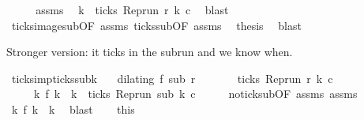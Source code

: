 \begin{isabellebody}
\ {\isacharminus}\isanewline
\ \ \isamarkupfalse%
\ assms{\isacharparenleft}{}{\isacharparenright}\ \isamarkupfalse%
\ k\ \ {\isacartoucheopen}ticks\ {\isacharparenleft}{\isacharparenleft}Rep{\isacharunderscore}run\ r{\isacharparenright}\ k\ c{\isacharparenright}{\isacartoucheclose}\ \isamarkupfalse%
\ blast\isanewline
\ \ \isamarkupfalse%
\ ticks{\isacharunderscore}image{\isacharunderscore}sub{\isacharbrackleft}OF\ assms{\isacharparenleft}{}{\isacharparenright}{\isacharbrackright}\ ticks{\isacharunderscore}sub{\isacharbrackleft}OF\ assms{\isacharparenleft}{}{\isacharparenright}{\isacharbrackright}\ \isamarkupfalse%
\ {\isacharquery}thesis\ \isamarkupfalse%
\ blast\isanewline
{}\isamarkupfalse%
%
\endisatagproof
{\isafoldproof}%
%
\isadelimproof
%
\endisadelimproof
%
\begin{isamarkuptext}%
Stronger version: it ticks in the subrun and we know when.%
\end{isamarkuptext}\isamarkuptrue%
\isamarkupfalse%
\ ticks{\isacharunderscore}imp{\isacharunderscore}ticks{\isacharunderscore}subk{\isacharcolon}\isanewline
\ \ \ {\isacartoucheopen}dilating\ f\ sub\ r{\isacartoucheclose}\isanewline
\ \ \ \ \ \ \ {\isacartoucheopen}ticks\ {\isacharparenleft}{\isacharparenleft}Rep{\isacharunderscore}run\ r{\isacharparenright}\ k\ c{\isacharparenright}{\isacartoucheclose}\isanewline
\ \ \ \ \ {\isacartoucheopen}{\isasymexists}k\ f\ k\ {\isacharequal}\ k\ {\isasymand}\ ticks\ {\isacharparenleft}{\isacharparenleft}Rep{\isacharunderscore}run\ sub{\isacharparenright}\ k\ c{\isacharparenright}{\isacartoucheclose}\isanewline
%
\isadelimproof
%
\endisadelimproof
%
\isatagproof
{}\isamarkupfalse%
\ {\isacharminus}\isanewline
\ \ \isamarkupfalse%
\ no{\isacharunderscore}tick{\isacharunderscore}sub{\isacharbrackleft}OF\ assms{\isacharparenleft}{}{\isacharparenright}{\isacharbrackright}\ assms{\isacharparenleft}{}{\isacharparenright}\ \isamarkupfalse%
\ {\isacartoucheopen}{\isasymexists}k\ f\ k\ {\isacharequal}\ k{\isacartoucheclose}\ \isamarkupfalse%
\ blast\isanewline
\ \ \isamarkupfalse%
\ this\ \isamarkupfalse%

\end{isabellebody}

